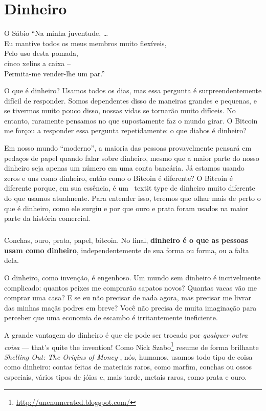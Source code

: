 \chapter{Dinheiro}
\label{les:11}

\begin{chapquote}{O Sábio}
\enquote{Na minha juventude, \ldots \\
Eu mantive todos os meus membros muito flexíveis, \\
Pelo uso desta pomada, \\
cinco xelins a caixa -- \\
Permita-me vender-lhe um par.}
\end{chapquote}

O que é dinheiro? Usamos todos os dias, mas essa pergunta é surpreendentemente 
difícil de responder. Somos dependentes disso de maneiras grandes e pequenas, 
e se tivermos muito pouco disso, nossas vidas se tornarão muito difíceis. 
No entanto, raramente pensamos no que supostamente faz o mundo girar.
O Bitcoin me forçou a responder essa pergunta repetidamente: o que diabos é dinheiro?

Em nosso mundo \enquote{moderno}, a maioria das pessoas provavelmente pensará em 
pedaços de papel quando falar sobre dinheiro, mesmo que a maior parte do nosso 
dinheiro seja apenas um número em uma conta bancária. Já estamos usando zeros 
e uns como dinheiro, então como o Bitcoin é diferente? O Bitcoin é diferente porque, 
em sua essência, é um \ textit {type} de dinheiro muito diferente do que usamos 
atualmente. Para entender isso, teremos que olhar mais de perto o que é dinheiro, 
como ele surgiu e por que ouro e prata foram usados na maior parte da história comercial.

\paragraph{}
Conchas, ouro, prata, papel, bitcoin. No final, \textbf{dinheiro é o que as pessoas usam 
como dinheiro}, independentemente de sua forma ou forma, ou a falta dela.

O dinheiro, como invenção, é engenhoso. Um mundo sem dinheiro é incrivelmente complicado: 
quantos peixes me comprarão sapatos novos? Quantas vacas vão me comprar uma casa? E 
se eu não precisar de nada agora, mas precisar me livrar das minhas maçãs podres em breve? 
Você não precisa de muita imaginação para perceber que uma economia de escambo é irritantemente 
ineficiente.

A grande vantagem do dinheiro é que ele pode ser trocado por \textit{qualquer outra 
coisa} --- that's quite the invention! Como Nick Szabo\footnote{\url{http://unenumerated.blogspot.com/}} 
resume de forma brilhante \textit{Shelling Out: The Origins of Money} \cite{shelling-out},  nós, 
humanos, usamos todo tipo de coisa como dinheiro: contas feitas de materiais raros, como marfim, 
conchas ou ossos especiais, vários tipos de jóias e, mais tarde, metais raros, como prata e ouro.

